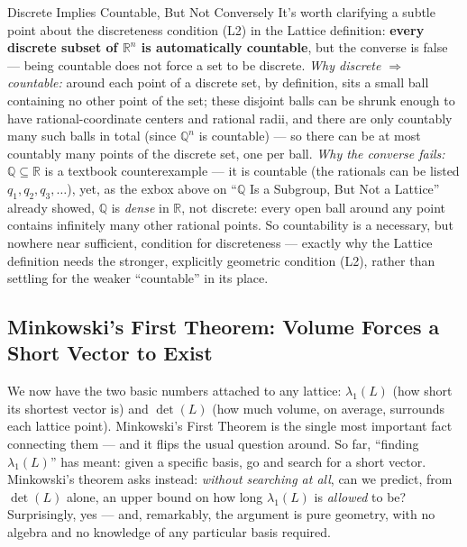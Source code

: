 \begin{rmkbox}{Discrete Implies Countable, But Not Conversely}
It's worth clarifying a subtle point about the discreteness condition (L2) in the Lattice definition: \textbf{every discrete subset of $\mathbb{R}^n$ is automatically countable}, but the converse is false --- being countable does not force a set to be discrete. \emph{Why discrete $\Rightarrow$ countable:} around each point of a discrete set, by definition, sits a small ball containing no other point of the set; these disjoint balls can be shrunk enough to have rational-coordinate centers and rational radii, and there are only countably many such balls in total (since $\mathbb{Q}^n$ is countable) --- so there can be at most countably many points of the discrete set, one per ball. \emph{Why the converse fails:} $\mathbb{Q} \subseteq \mathbb{R}$ is a textbook counterexample --- it is countable (the rationals can be listed $q_1, q_2, q_3,\ldots$), yet, as the exbox above on ``$\mathbb{Q}$ Is a Subgroup, But Not a Lattice'' already showed, $\mathbb{Q}$ is \emph{dense} in $\mathbb{R}$, not discrete: every open ball around any point contains infinitely many other rational points. So countability is a necessary, but nowhere near sufficient, condition for discreteness --- exactly why the Lattice definition needs the stronger, explicitly geometric condition (L2), rather than settling for the weaker ``countable'' in its place.
\end{rmkbox}

\subsection{Minkowski's First Theorem: Volume Forces a Short Vector to Exist}
\label{sec:L1:minkowski-s-first-theorem-volume-forces}

We now have the two basic numbers attached to any lattice: $\lambda_1(L)$ (how short its shortest vector is) and $\det(L)$ (how much volume, on average, surrounds each lattice point). Minkowski's First Theorem is the single most important fact connecting them --- and it flips the usual question around. So far, ``finding $\lambda_1(L)$'' has meant: given a specific basis, go and search for a short vector. Minkowski's theorem asks instead: \emph{without searching at all}, can we predict, from $\det(L)$ alone, an upper bound on how long $\lambda_1(L)$ is \emph{allowed} to be? Surprisingly, yes --- and, remarkably, the argument is pure geometry, with no algebra and no knowledge of any particular basis required.

